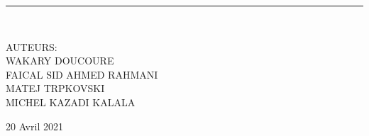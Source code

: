 \documentclass[12pt]{article}
\newcommand{\HRule}{\rule{\linewidth}{0.5mm}}
\begin{document}
\begin{titlepage}
\begin{sffamily}
\begin{center}
    \HRule \\[2cm]
    
    

    \begin{minipage}{0.4\textwidth}
      \begin{center}\large
      	AUTEURS:\\
      	WAKARY DOUCOURE\\FAICAL SID AHMED RAHMANI\\MATEJ TRPKOVSKI\\MICHEL KAZADI KALALA
      \end{center}
    \end{minipage}

    \vfill    
    {\large 20 Avril 2021}

  \end{center}
  \end{sffamily}
\end{titlepage}

	\thispagestyle{empty}
	\setcounter{page}{0}
  	\newpage
  	\tableofcontents
  	\newpage
  	

  	
\end{document}
